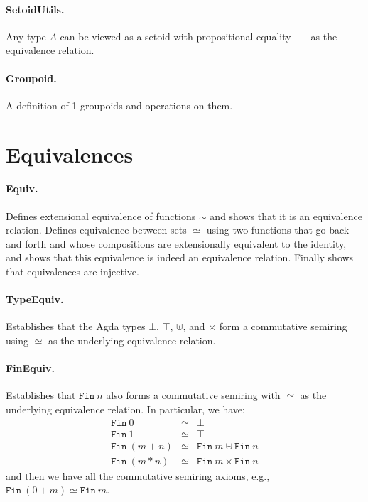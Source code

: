 \documentclass{article}
\begin{document}
\paragraph*{SetoidUtils.} Any type $A$ can be viewed as a setoid with propositional equality $\equiv$ as the equivalence relation.

\paragraph*{Groupoid.} A definition of 1-groupoids and operations on them.

\section{Equivalences} 

\paragraph*{Equiv.} Defines extensional equivalence of functions $\sim$ and shows that it is an equivalence relation. Defines equivalence between sets $\simeq$ using two functions that go back and forth and whose compositions are extensionally equivalent to the identity, and shows that this equivalence is indeed an equivalence relation. Finally shows that equivalences are injective.

\paragraph*{TypeEquiv.} Establishes that the Agda types $\bot$, $\top$, $\uplus$, and $\times$ form a commutative semiring using $\simeq$ as the underlying equivalence relation.

\paragraph*{FinEquiv.} Establishes that $\texttt{Fin}~n$ also forms a commutative semiring with $\simeq$ as the underlying equivalence relation. In particular, we have:
\[\begin{array}{rcll}
\texttt{Fin}~0 &\simeq& \bot \\
\texttt{Fin}~1 &\simeq& \top \\
\texttt{Fin}~(m+n) &\simeq& \texttt{Fin}~m \uplus \texttt{Fin}~n \\
\texttt{Fin}~(m*n) &\simeq& \texttt{Fin}~m \times \texttt{Fin}~n
\end{array}\]
and then we have all the commutative semiring axioms, e.g.,
$\texttt{Fin}~(0+m) \simeq \texttt{Fin}~m$. 
\end{document}
